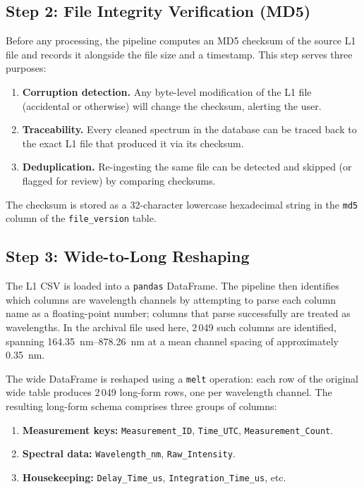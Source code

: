 \documentclass[a4paper,twocolumn,10pt]{article}
\begin{document}
\subsection{Step 2: File Integrity Verification (MD5)}

Before any processing, the pipeline computes an MD5 checksum of the
source L1 file and records it alongside the file size and a
timestamp.  This step serves three purposes:

\begin{enumerate}[nosep,leftmargin=*]
  \item \textbf{Corruption detection.}  Any byte-level modification of
    the L1 file (accidental or otherwise) will change the checksum,
    alerting the user.
  \item \textbf{Traceability.}  Every cleaned spectrum in the database
    can be traced back to the exact L1 file that produced it via its
    checksum.
  \item \textbf{Deduplication.}  Re-ingesting the same file can be
    detected and skipped (or flagged for review) by comparing
    checksums.
\end{enumerate}

The checksum is stored as a 32-character lowercase hexadecimal string
in the \texttt{md5} column of the \texttt{file\_version} table.

\subsection{Step 3: Wide-to-Long Reshaping}

The L1 CSV is loaded into a \texttt{pandas} DataFrame.  The pipeline
then identifies which columns are wavelength channels by attempting to
parse each column name as a floating-point number; columns that parse
successfully are treated as wavelengths.  In the archival file used
here, 2\,049 such columns are identified, spanning
\SIrange{164.35}{878.26}{\nano\metre} at a mean channel spacing of
approximately \SI{0.35}{\nano\metre}.

The wide DataFrame is reshaped using a \texttt{melt} operation: each
row of the original wide table produces 2\,049 long-form rows, one
per wavelength channel.  The resulting long-form schema comprises
three groups of columns:

\begin{enumerate}[nosep,leftmargin=*]
  \item \textbf{Measurement keys:} \texttt{Measurement\_ID},
    \texttt{Time\_UTC}, \texttt{Measurement\_Count}.
  \item \textbf{Spectral data:} \texttt{Wavelength\_nm},
    \texttt{Raw\_Intensity}.
  \item \textbf{Housekeeping:} \texttt{Delay\_Time\_us},
    \texttt{Integration\_Time\_us}, etc.
\end{enumerate}
\end{document}
